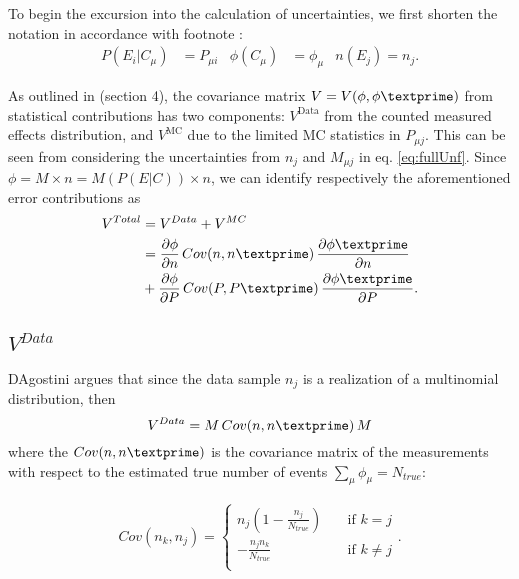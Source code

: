 

To begin the excursion into the calculation of uncertainties, we first shorten the notation in accordance with footnote :
\begin{align*}
	P(E_{i}|C_{\mu}) &= P_{\mu i}
	&
	\phi(C_{\mu}) &= \phi_{\mu}
	&
	n(E_{j}) = n_{j}.
\end{align*}

As outlined in \cite{agostini} (section 4), the covariance matrix $V=V(\phi,\phi\textprime)$ from statistical contributions has two components: 
$V^{\mathrm{Data}}$ from the counted measured effects distribution, and $V^{\mathrm{MC}}$ due to the limited MC statistics in $P_{\mu j}$.
This can be seen from considering the uncertainties from $n_{j}$ and $M_{\mu j}$ in eq. \ref{eq:fullUnf}.
Since $\phi=M\times n=M(P(E|C))\times n$, we can identify respectively the aforementioned error contributions as
\begin{align*}
  V^{Total} &= V^{Data}+V^{MC} \\
  &= \frac{\partial \phi}{\partial n} \, Cov({n,n\textprime}) \, \frac{\partial \phi\textprime}{\partial n}
  \\
  &
  +\frac{\partial \phi}{\partial P} \, Cov({P,P\textprime}) \, \frac{\partial \phi\textprime}{\partial P}.
\end{align*}

\subsection{$V^{Data}$}
D\textquotesingle Agostini argues that since the data sample $n_{j}$ is a realization of a multinomial distribution,
then
\begin{equation} \label{eq:Vn_agos}
V^{Data} = M \, Cov(n,n\textprime) \, M
\end{equation}
where the $Cov(n,n\textprime)$ is the 
covariance matrix of the measurements with respect to the estimated true number of events $\sum_{\mu}{\phi_{\mu}}=N_{true}$:

\begin{equation}
 \begin{split}
Cov(n_{k},n_{j}) = 
  \begin{cases}
    n_{j}(1-\frac{n_{j}}{N_{true}})       & \quad \text{if } k = j \\
    -\frac{n_{j}n_{k}}{N_{true}}  & \quad \text{if } k \ne j \\
  \end{cases}.
 \end{split}
\end{equation}

